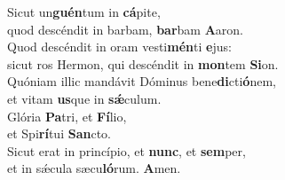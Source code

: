 \evenverse Sicut un\textbf{guén}tum in \textbf{cá}pite,~\*\\
\evenverse quod descéndit in barbam, \textbf{bar}bam \textbf{A}aron.\\
\oddverse Quod descéndit in oram vesti\textbf{mén}ti \textbf{e}jus:~\*\\
\oddverse sicut ros Hermon, qui descéndit in \textbf{mon}tem \textbf{Si}on.\\
\evenverse Quóniam illic mandávit Dóminus bene\textbf{di}cti\textbf{ó}nem,~\*\\
\evenverse et vitam \textbf{us}que in \textbf{sǽ}culum.\\
\oddverse Glória \textbf{Pa}tri, et \textbf{Fí}lio,~\*\\
\oddverse et Spi\textbf{rí}tui \textbf{San}cto.\\
\evenverse Sicut erat in princípio, et \textbf{nunc}, et \textbf{sem}per,~\*\\
\evenverse et in sǽcula sæcu\textbf{ló}rum. \textbf{A}men.\\
